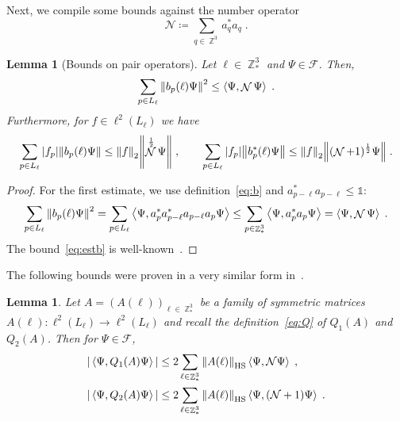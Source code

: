 \documentclass[12pt,a4paper]{article}
\numberwithin{equation}{section}
\newcommand{\cF}{\mathcal{F}}
\newcommand{\cN}{\mathcal{N}}
\newcommand{\1}{\mathbb{I}}
\newcommand{\HS}{\mathrm{HS}}
\DeclareMathOperator{\Z}{\mathbb{Z}}
\DeclareMathOperator{\NN}{\mathcal{N}}
\newcommand{\half}{\frac{1}{2}}
\newcommand{\eva}[1]{\left\langle #1 \right\rangle}
\theoremstyle{plain}
\newtheorem{lemma}[theorem]{Lemma}
\theoremstyle{definition}
\theoremstyle{remark}
\theoremstyle{plain}
\theoremstyle{definition}
\theoremstyle{remark}
\begin{document}
Next, we compile some bounds against the number operator
\begin{equation} \label{eq:cN}
	\cN \coloneq \sum_{q \in \Z^3} a_q^* a_q \;.
\end{equation}

\begin{lemma}[Bounds on pair operators]\label{lem:pairest}
Let $\ell \in \Z^3_*$ and $ \Psi \in \cF $. Then,
\begin{equation}\label{eq:estopb}
	\sum_{p \in L_\ell}\norm{b_p(\ell)\Psi}^2
	\leq \eva{\Psi, \NN\Psi} \;.
\end{equation}
Furthermore, for $f \in \ell^2(L_\ell)$ we have
\begin{equation} \label{eq:estb}
	\sum_{p\in L_\ell} |f_p| \norm{b_p(\ell) \Psi}
	\leq \norm{f}_2 \norm{\NN^\half\Psi} \;, \qquad
	\sum_{p\in L_\ell} |f_p| \norm{b^*_p(\ell) \Psi}
	\leq \norm{f}_2 \norm{(\NN+1)^\half\Psi} \;.
\end{equation}
\end{lemma}
\begin{proof}
For the first estimate, we use definition~\eqref{eq:b} and $a^*_{p-\ell}a_{p-\ell} \leq \mathds{1}$:
\begin{equation}
	\sum_{p \in L_\ell}\norm{b_p(\ell)\Psi}^2
	= \sum_{p \in L_\ell} \eva{\Psi,a^*_{p} a^*_{p-\ell}a_{p-\ell} a_{p}\Psi}
	\leq \sum_{p \in \Z^3_*} \eva{\Psi, a^*_{p} a_{p}\Psi}
	= \eva{\Psi, \NN \Psi} \;.
\end{equation}
The bound~\eqref{eq:estb} is well-known~\cite[Prop.~4.2]{CHN21}.
\end{proof}

The following bounds were proven in a very similar form in~\cite[Prop.~4.7]{CHN21}.

\begin{lemma}\label{lem:estQ2}
Let $A = (A(\ell))_{\ell \in \Z^3_*}$ be a family of symmetric matrices $ A(\ell) : \ell^2(L_\ell) \to \ell^2(L_\ell) $ and recall the definition~\eqref{eq:Q} of $ Q_1(A) $ and $ Q_2(A) $. Then for $ \Psi \in \cF $,
\begin{equation} \label{eq:Qest}
\begin{aligned}
	|\eva{\Psi,Q_1(A)\Psi}|
	&\leq 2\sum_{\ell\in \Z^3_*}\norm{A(\ell)}_{\HS}\eva{\Psi,\mathcal{N} \Psi} \;, \\
	|\eva{\Psi,Q_2(A)\Psi}|
	&\leq 2\sum_{\ell\in \Z^3_*}\norm{A(\ell)}_{\HS}\eva{\Psi,(\mathcal{N}+1) \Psi} \;.
\end{aligned}
\end{equation}
\end{lemma}
\end{document}
